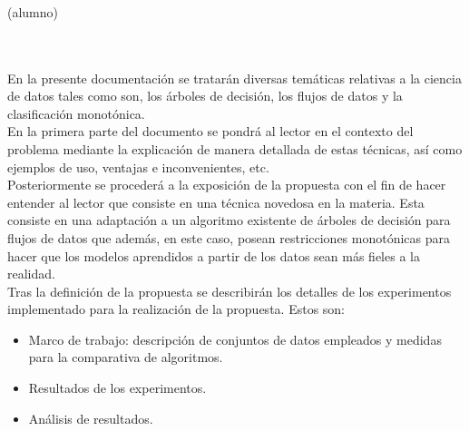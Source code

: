 \chapter*{}






\cleardoublepage
\thispagestyle{empty}

\begin{center}
{\large\bfseries \myTitle}\\
\end{center}
\begin{center}
\myName(alumno)\\
\end{center}

\\

\vspace{0.7cm}
\\

En la presente documentación se tratarán diversas temáticas relativas a la ciencia de datos tales como son, los árboles de decisión, los flujos de datos y la clasificación monotónica.\\

 En la primera parte del documento se pondrá al lector en el contexto del problema mediante la explicación de manera detallada de estas técnicas, así como ejemplos de uso, ventajas e inconvenientes, etc.\\
 
  Posteriormente se procederá a la exposición de la propuesta con el fin de hacer entender al lector que consiste en una técnica novedosa en la materia. Esta consiste en una adaptación a un algoritmo existente de árboles de decisión para flujos de datos que además, en este caso, posean restricciones monotónicas para hacer que los modelos aprendidos a partir de los datos sean más fieles a la realidad.\\
  
 Tras la definición de la propuesta se describirán los detalles de los experimentos implementado para la realización de la propuesta. Estos son:
 \begin{itemize}
 	\item Marco de trabajo: descripción de conjuntos de datos empleados y medidas para la comparativa de algoritmos.
 	\item Resultados de los experimentos.
 	\item Análisis de resultados.
 \end{itemize}

